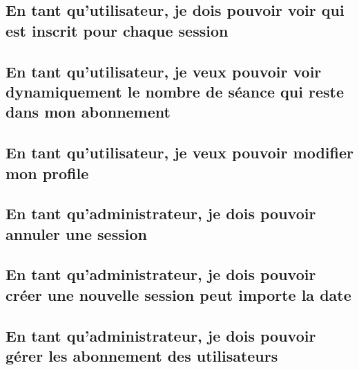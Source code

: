 	\vspace{\baselineskip}
	\subsection{En tant qu’utilisateur, je dois pouvoir voir qui est inscrit pour chaque session}
		
	
	\newpage
	\subsection{En tant qu’utilisateur, je veux pouvoir voir dynamiquement le nombre de séance qui reste dans mon abonnement}
		

	\vspace{\baselineskip}	
	\subsection{En tant qu'utilisateur, je veux pouvoir modifier mon profile}
		

	\vspace{\baselineskip}
	\subsection{En tant qu’administrateur, je dois pouvoir annuler une session}
		

	\newpage
	\subsection{En tant qu'administrateur, je dois pouvoir créer une nouvelle session peut importe la date}
		

	\newpage
	\subsection{En tant qu'administrateur, je dois pouvoir gérer les abonnement des utilisateurs}
		
